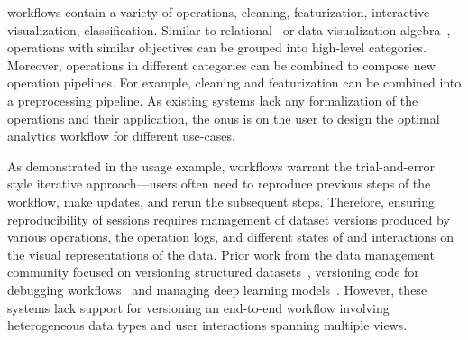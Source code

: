 \vita workflows contain a variety of operations, \eg cleaning, featurization, interactive visualization, classification. Similar to relational~\cite{codd} or data visualization algebra~\cite{satyanarayan2016vega}, \vita operations with similar objectives can be grouped into high-level categories. Moreover, operations in different categories can be combined to compose new operation pipelines. For example, cleaning and featurization can be combined into a preprocessing pipeline. As existing systems lack any formalization of the operations and their application, the onus is on the user to design the optimal analytics workflow for different use-cases.

 As demonstrated in the usage example, \vita workflows warrant the trial-and-error style  iterative approach---users often need to reproduce previous steps of the workflow, make updates, and rerun the subsequent steps. 
Therefore, ensuring reproducibility of  \vita sessions requires management of dataset versions produced by various operations, the operation logs, and different states of and interactions on the visual representations of the data. 
Prior work from the data management community focused on versioning structured datasets~\cite{huang2017orpheusdb}, versioning code for debugging workflows~\cite{brachmannbyour,miao2016provdb} and managing deep learning models~\cite{miao2016modelhub}.
However, these systems lack support for versioning an end-to-end \vita workflow involving heterogeneous data types and user interactions spanning multiple views. 

